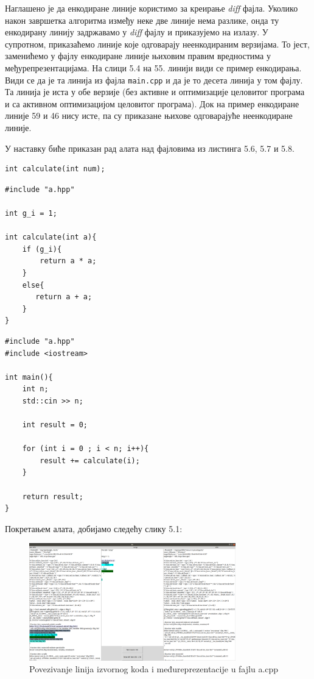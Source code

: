 \documentclass[12pt,oneside]{memoir}
\begin{document}
Наглашено је да енкодиране линије користимо за креирање \textit{diff} фајла.
Уколико након завршетка алгоритма између неке две линије нема разлике, онда ту
енкодирану линију задржавамо у \textit{diff} фајлу и приказујемо на излазу.
У супротном, приказаћемо линије које одговарају неенкодираним верзијама.
То јест, заменићемо у фајлу енкодиране линије њиховим правим вредностима у међурепрезентацијама.
На слици 5.4 на 55. линији види се пример енкодирања. 
Види се да је та линија из фајла \texttt{main.cpp} и да је то десета линија у том фајлу.
Та линија је иста у обе верзије (без активне и оптимизације целовитог програма
и са активном оптимизацијом целовитог програма).
Док на пример енкодиране линије 59 и 46 нису исте, па су приказане њихове
 одговарајуће неенкодиране линије. 

У наставку биће приказан рад алата над фајловима из листинга 5.6, 5.7 и 5.8.

\begin{lstlisting}[frame=single, caption=a.hpp, captionpos=b]
int calculate(int num);
\end{lstlisting}

\begin{lstlisting}[frame=single, caption=a.cpp, captionpos=b]
#include "a.hpp"

int g_i = 1;

int calculate(int a){
    if (g_i){
        return a * a;
    }
    else{
       return a + a;
    }  
}
\end{lstlisting}

\begin{lstlisting}[frame=single, caption=main.cpp, captionpos=b]
#include "a.hpp"
#include <iostream>

int main(){
    int n;
    std::cin >> n;
    
    int result = 0;

    for (int i = 0 ; i < n; i++){
        result += calculate(i);
    }

    return result;
}

\end{lstlisting}

Покретањем алата, добијамо следећу слику 5.1:

\begin{figure}[!ht]
  \centering
  \includegraphics[width=0.8\textwidth]{a_cpp.png}
  \caption{ Povezivanje linija izvornog koda i međureprezentacije u fajlu a.cpp }
  \label{fig:grafikon}
\end{figure}
\end{document}
